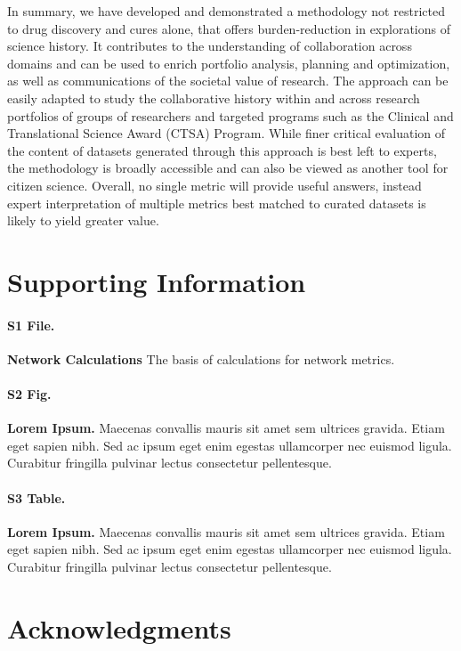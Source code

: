 \documentclass[10pt,letterpaper]{article}
\begin{document}
In summary, we have developed and demonstrated a methodology not restricted to  drug discovery and cures alone, that offers burden-reduction in explorations of science history. It contributes to the understanding of collaboration across domains and can be used to  enrich portfolio analysis, planning and optimization, as well as communications of the societal value of research. The approach can be easily adapted to study the collaborative history within and across research portfolios of groups of researchers and targeted programs such as the Clinical and Translational Science Award (CTSA) Program. While finer critical evaluation of the content of datasets generated through this approach is best left to experts, the methodology is broadly accessible and can also be viewed as another tool for citizen science. Overall, no single metric will provide useful answers, instead expert interpretation of multiple metrics best matched to curated datasets is likely to yield greater value.

\section*{Supporting Information}

\paragraph*{S1 File.}
\label{S1_File}
{\bf Network Calculations} The basis of calculations for network metrics.

\paragraph*{S2 Fig.}
\label{S2_Fig}
{\bf Lorem Ipsum.} Maecenas convallis mauris sit amet sem ultrices gravida. Etiam eget sapien nibh. Sed ac ipsum eget enim egestas ullamcorper nec euismod ligula. Curabitur fringilla pulvinar lectus consectetur pellentesque.

\paragraph*{S3 Table.}
\label{S1_Table}
{\bf Lorem Ipsum.} Maecenas convallis mauris sit amet sem ultrices gravida. Etiam eget sapien nibh. Sed ac ipsum eget enim egestas ullamcorper nec euismod ligula. Curabitur fringilla pulvinar lectus consectetur pellentesque.

\section*{Acknowledgments} %
\end{document}
